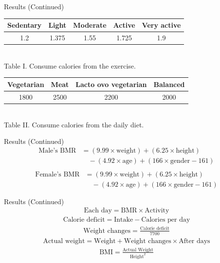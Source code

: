 \documentclass[fleqn]{beamer}
\begin{document}
\begin{frame}{Results (Continued)}
\vspace{2em}
\sloppy
\renewcommand{\arraystretch}{1.35}
\centering
\begin{tabular}{|c|c|c|c|c|}
\hline
Sedentary & Light & Moderate & Active & Very active \\
\hline
1.2 & 1.375 & 1.55 & 1.725 & 1.9 \\
\hline
\end{tabular}
\vspace{1em} \\
Table I. Consume calories from the exercise. 
\vspace{1em} \\
\begin{tabular}{|c|c|c|c|}
\hline
Vegetarian & Meat & Lacto ovo vegetarian & Balanced \\
\hline
1800 & 2500 & 2200 & 2000 \\
\hline
\end{tabular}
\vspace{1em} \\
Table II. Consume calories from the daily diet. 
\vspace{1em} \\
\end{frame}
\begin{frame}{Results (Continued)}
\sloppy
\begin{align*}
\text{Male's BMR} &= (9.99 \times \text{weight}) + (6.25 \times \text{height}) \\
&\quad - (4.92 \times \text{age}) + (166 \times \text{gender} - 161) \\
\end{align*}
\begin{align*}
\text{Female's BMR} &= (9.99 \times \text{weight}) + (6.25 \times \text{height}) \\
&\quad - (4.92 \times \text{age}) + (166 \times \text{gender} - 161)
\end{align*}
\end{frame}
\begin{frame}{Results (Continued)}
\sloppy
\begin{align*}
\text{Each day} = \text{BMR} \times \text{Activity}
\end{align*}
\begin{align*}
\text{Calorie deficit} = \text{Intake} - \text{Calories per day}
\end{align*}
\begin{align*}
\text{Weight changes} = \frac{\text{Calorie deficit}}{7700} 
\end{align*}
\begin{align*}
\text{Actual weight}= \text{Weight} + \text{Weight changes} \times \text{After days}
\end{align*}
\begin{align*}
\text{BMI} = \frac{\text{Actual Weight}}{\text{Height}^2}
\end{align*}
\end{frame}
\end{document}
